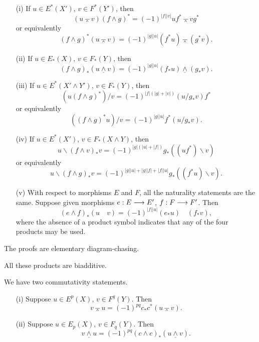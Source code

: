 \documentclass[../main]{subfiles}
\begin{document}
\begin{proposition}\label{prop:p3ch09.1}
\begin{enumerate}
    \item[(i)] If \(u \in E^\ast(X')\), \(v \in F^\ast(Y')\), then $$(u \barwedge v)(f \wedge g)^\ast = (-1)^{|f||v|} u f^\ast \barwedge v g^\ast$$ or equivalently $$(f \wedge g)^\ast (u \barwedge v) = (-1)^{|g| |u|} (f^\ast u) \barwedge (g^\ast v).$$
    \item[(ii)] If \(u \in E_\ast(X)\), \(v \in F_\ast(Y)\), then $$(f \wedge g)_\ast(u \underline \wedge v) = (-1)^{|g| |u|} (f_\ast u) \underline \wedge (g_\ast v).$$ 
    \item[(iii)] If \(u \in E^\ast(X' \wedge Y')\), \(v \in F_\ast(Y)\), then $$(u(f \wedge g)^\ast)/v = (-1)^{|f|(|g| + |v|)} (u/g_\ast v)f^\ast$$ or equivalently $$((f \wedge g)^\ast u)/v = (-1)^{|g| |u|} f^\ast (u/g_\ast v).$$
    \item[(iv)] If \(u \in E^\ast(X')\), \(v \in F_\ast(X \wedge Y)\), then $$u \backslash (f \wedge v)_\ast v = (-1)^{|g|(|u| + |f|)} g_\ast((uf^\ast) \backslash v)$$ or equivalently $$u \backslash (f \wedge g)_\ast v = (-1)^{|g| |u| + |g| |f| + |f| |u|} g_\ast((f^\ast u) \backslash v).$$
    \item[(v)] With respect to morphisms $E$ and $F$, all the naturality statements are the same. Suppose given morphisms $e : E \overset{}{\longrightarrow} E'$, $f : F \overset{}{\longrightarrow} F'$. Then $$(e \wedge f)_\ast (u \quad v) = (-1)^{|f| |u|} (e_\ast u) \quad (f_\ast v),$$ where the absence of a product symbol indicates that any of the four products may be used. 
\end{enumerate}
\end{proposition}

The proofs are elementary diagram-chasing.

\begin{proposition}\label{prop:p3ch09.2}
All these products are biadditive.
\end{proposition}

We have two commutativity statements. 

\begin{proposition}\label{prop:p3ch09.3}
\begin{itemize}
    \item[(i)] Suppose \(u \in E^p(X)\), \(v \in F^q(Y)\). Then $$v \barwedge u = (-1)^{pq} c_\ast c^\ast(u \barwedge v).$$
    \item[(ii)] Suppose \(u \in E_p(X)\), \(v \in F_q(Y)\). Then $$v \underline \wedge u = (-1)^{pq} (c \wedge c)_\ast (u \underline \wedge v).$$
\end{itemize}
\end{proposition}
\end{document}
